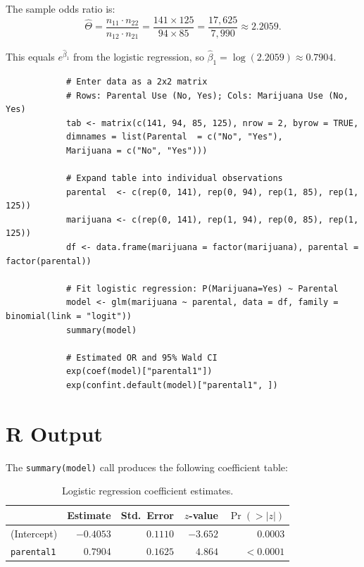 \documentclass[letterpaper]{article}
\begin{document}
		The sample odds ratio is:
		\[
		\hat{\Theta} = \frac{n_{11} \cdot n_{22}}{n_{12} \cdot n_{21}}
		= \frac{141 \times 125}{94 \times 85}
		= \frac{17{,}625}{7{,}990}
		\approx 2.2059.
		\]
		
		This equals $e^{\hat{\beta}_1}$ from the logistic regression, so
		$\hat{\beta}_1 = \log(2.2059) \approx 0.7904$.
		
	
		\begin{verbatim}
			# Enter data as a 2x2 matrix
			# Rows: Parental Use (No, Yes); Cols: Marijuana Use (No, Yes)
			tab <- matrix(c(141, 94, 85, 125), nrow = 2, byrow = TRUE,
			dimnames = list(Parental  = c("No", "Yes"),
			Marijuana = c("No", "Yes")))
			
			# Expand table into individual observations
			parental  <- c(rep(0, 141), rep(0, 94), rep(1, 85), rep(1, 125))
			marijuana <- c(rep(0, 141), rep(1, 94), rep(0, 85), rep(1, 125))
			df <- data.frame(marijuana = factor(marijuana), parental = factor(parental))
			
			# Fit logistic regression: P(Marijuana=Yes) ~ Parental
			model <- glm(marijuana ~ parental, data = df, family = binomial(link = "logit"))
			summary(model)
			
			# Estimated OR and 95% Wald CI
			exp(coef(model)["parental1"])
			exp(confint.default(model)["parental1", ])
		\end{verbatim}
		
		\section*{R Output}
		
		The \texttt{summary(model)} call produces the following coefficient table:
		
		\begin{table}[H]
			\centering
			\begin{tabular}{lrrrr}
				\toprule
				& Estimate & Std.\ Error & $z$-value & $\Pr(>|z|)$ \\
				\midrule
				(Intercept) & $-0.4053$ & $0.1110$ & $-3.652$ & $0.0003$ \\
				\texttt{parental1}   & $\phantom{-}0.7904$ & $0.1625$ & $\phantom{-}4.864$ & $< 0.0001$ \\
				\bottomrule
			\end{tabular}
			\caption{Logistic regression coefficient estimates.}
		\end{table}
		
\end{document}
